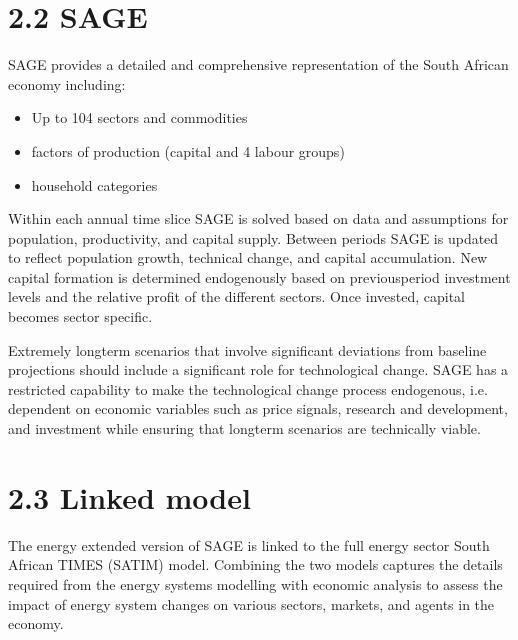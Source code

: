 \documentclass[letterpaper,10pt,english]{jupyterBook}
\begin{document}
\section{2.2 SAGE}
\label{\detokenize{02SATIMGE:sage}}
\sphinxAtStartPar
{} SAGE provides a detailed and comprehensive representation of the South African economy including:
\begin{itemize}
\item {} 
\sphinxAtStartPar
Up to 104 sectors and commodities

\item {} 
 factors of production (capital and 4 labour groups)

\item {} 
 household categories

\end{itemize}

\sphinxAtStartPar
Within each annual time slice SAGE is solved based on data and assumptions for population, productivity, and capital supply. Between periods SAGE is updated to reflect population growth, technical change, and capital accumulation. New capital formation is determined endogenously based on previous\sphinxhyphen{}period investment levels and the relative profit of the different sectors. Once invested, capital becomes sector specific.

\sphinxAtStartPar
Extremely long\sphinxhyphen{}term scenarios that involve significant deviations from baseline projections should include a significant role for technological change. SAGE has a restricted capability to make the technological change process endogenous, i.e. dependent on economic variables such as price signals, research and development, and investment while ensuring that long\sphinxhyphen{}term scenarios are technically viable.


\section{2.3 Linked model}
\label{\detokenize{02SATIMGE:linked-model}}
\sphinxAtStartPar
The energy extended version of SAGE is linked to the full energy sector South African TIMES (SATIM) model. Combining the two models captures the details required from the energy systems modelling with economic analysis to assess the impact of energy system changes on various sectors, markets, and agents in the economy.
\end{document}
